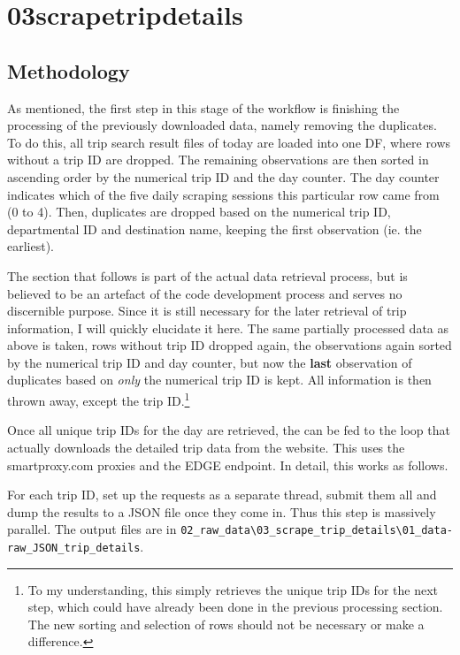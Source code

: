 \documentclass[11pt,a4paper]{article}
\begin{document}
\clearpage %
\section{03\textunderscore scrape\textunderscore trip\textunderscore details}

\subsection{Methodology}
As mentioned, the first step in this stage of the workflow is finishing the processing of the previously downloaded data, namely removing the duplicates.
To do this, all trip search result files of today are loaded into one DF, where rows without a trip ID are dropped.
The remaining observations are then sorted in ascending order by the numerical trip ID and the day counter. 
The day counter indicates which of the five daily scraping sessions this particular row came from (0 to 4).
Then, duplicates are dropped based on the numerical trip ID, departmental ID and destination name, keeping the first observation (ie. the earliest). 


The section that follows is part of the actual data retrieval process, but is believed to be an artefact of the code development process and serves no discernible purpose.
Since it is still necessary for the later retrieval of trip information, I will quickly elucidate it here.
The same partially processed data as above is taken, rows without trip ID dropped again, the observations again sorted by the numerical trip ID and day counter, but now the \textbf{last} observation of duplicates based on \textit{only} the numerical trip ID is kept. 
All information is then thrown away, except the trip ID.\footnote{To my understanding, this simply retrieves the unique trip IDs for the next step, which could have already been done in the previous processing section. The new sorting and selection of rows should not be necessary or make a difference.}

Once all unique trip IDs for the day are retrieved, the can be fed to the loop that actually downloads the detailed trip data from the website.
This uses the smartproxy.com proxies and the EDGE endpoint.
In detail, this works as follows.

For each trip ID, set up the requests as a separate thread, submit them all and dump the results to a JSON file once they come in. 
Thus this step is massively parallel.
The output files are in \verb|02_raw_data\03_scrape_trip_details\01_data-raw_JSON_trip_details|.
\end{document}
